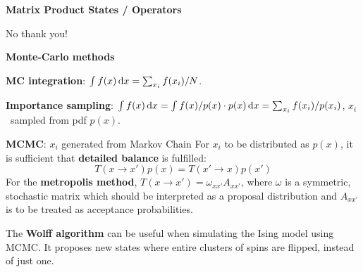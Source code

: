 \documentclass[10pt,landscape]{article}
\newcommand{\topiccolor}{green}
\newcommand{\topic}[2]{%
	\renewcommand{\topiccolor}{#1}
	\begin{tcolorbox}[boxsep=0.5mm, left=1mm, right=1mm, top=0mm, bottom=0mm,
		colback=#1!30, colframe=#1, arc is angular]%
		\centering \textbf{#2}%
	\end{tcolorbox}%
}
\newcommand{\cbf}[1]{\textcolor{\topiccolor!70!black}{\textbf{#1}}}
\begin{document}
\begin{multicols*}{3}
\topic{cyan}{Matrix Product States / Operators}

No thank you!

\topic{red}{Monte-Carlo methods}

\cbf{MC integration}:
$\int f(x) \dl x = \sum_{x_i} f(x_i)/N$.

\cbf{Importance sampling}:
$\int f(x) \dl x = \int f(x)/p(x) \cdot p(x) \dl x = \sum_{x_i} f(x_i) / p(x_i)$,
$x_i$ sampled from pdf $p(x)$.

\cbf{MCMC}: $x_i$ generated from Markov Chain
For $x_i$ to be distributed as $p(x)$, it is sufficient that
\cbf{detailed balance} is fulfilled:
\[
	T(x \to x') p(x) = T(x' \to x) p(x')
\]
For the \cbf{metropolis method}, $T(x \to x') = \omega_{xx'}A_{x x'}$,
where $\omega$ is a symmetric, stochastic matrix which should
be interpreted as a proposal distribution and $A_{x x'}$ is
to be treated as acceptance probabilities.

The \cbf{Wolff algorithm} can be useful when simulating the Ising model
using MCMC.
It proposes new states where entire clusters of spins are flipped,
instead of just one.


\end{multicols*}
\end{document}
